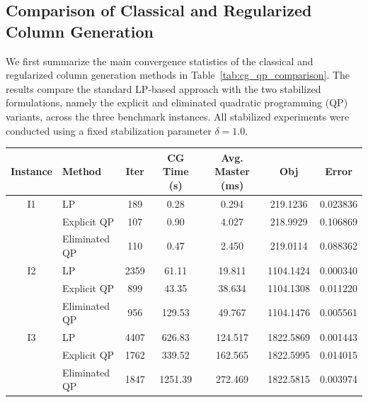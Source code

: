 \documentclass{book}
\theoremstyle{definition}
\numberwithin{algorithm_}{chapter}
\begin{document}
{\subsection{Comparison of Classical and Regularized Column Generation}

We first summarize the main convergence statistics of the classical and regularized column generation methods in Table~\ref{tab:cg_qp_comparison}. The results compare the standard LP-based approach with the two stabilized formulations, namely the explicit and eliminated quadratic programming (QP) variants, across the three benchmark instances. All stabilized experiments were conducted using a fixed stabilization parameter $\delta = 1.0$.

\begin{table}[ht]
\centering

\renewcommand{\arraystretch}{1.2}

\begin{tabular}{c l c c c c c}
\hline
Instance & Method & Iter & CG Time (s) & Avg. Master (ms) & Obj & Error \\
\hline

I1 
& LP 
& 189 
& 0.28 
& 0.294 
& 219.1236 
& 0.023836 \\

& Explicit QP 
& 107 
& 0.90 
& 4.027 
& 218.9929 
& 0.106869 \\

& Eliminated QP 
& 110 
& 0.47 
& 2.450 
& 219.0114 
& 0.088362 \\

\hline

I2 
& LP 
& 2359 
& 61.11 
& 19.811 
& 1104.1424 
& 0.000340 \\

& Explicit QP 
& 899 
& 43.35 
& 38.634 
& 1104.1308 
& 0.011220 \\

& Eliminated QP 
& 956 
& 129.53 
& 49.767 
& 1104.1476 
& 0.005561 \\

\hline

I3 
& LP 
& 4407 
& 626.83 
& 124.517
& 1822.5869
& 0.001443 \\

& Explicit QP 
& 1762 
& 339.52
& 162.565
& 1822.5995 
& 0.014015 \\

& Eliminated QP 
& 1847 
& 1251.39
& 272.469
& 1822.5815
& 0.003974 \\


\end{tabular}
\end{table}}
\end{document}
